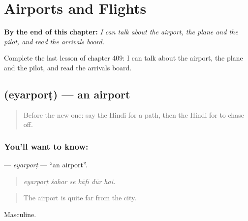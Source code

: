 
\chapter{Airports and Flights}
\label{ch:hi-airports-and-flights}

\begin{chapteropening}
\textbf{By the end of this chapter:} \emph{I can talk about the airport, the plane and the pilot, and read the arrivals board.}

Complete the last lesson of chapter 409: I can talk about the airport, the plane and the pilot, and read the arrivals board.
\end{chapteropening}

\section[\texorpdfstring{\hi{एयरपोर्ट} (eyarporṭ)}{एयरपोर्ट (eyarporṭ)}]{ (eyarporṭ) — an airport}

\label{lesson:HI-C409-eyarport}



\begin{quote}
Before the new one: say the Hindi for a path, then the Hindi for to chase off.
\end{quote}

\subsection*{You'll want to know: }
\textbf{} — \emph{eyarporṭ} — \textquotedblleft{}an airport\textquotedblright{}.

\begin{quote}
     
\end{quote}

\begin{quote}
\emph{eyarporṭ śahar se kāfī dūr hai.}
\end{quote}

\begin{quote}
The airport is quite far from the city.
\end{quote}

Masculine.

